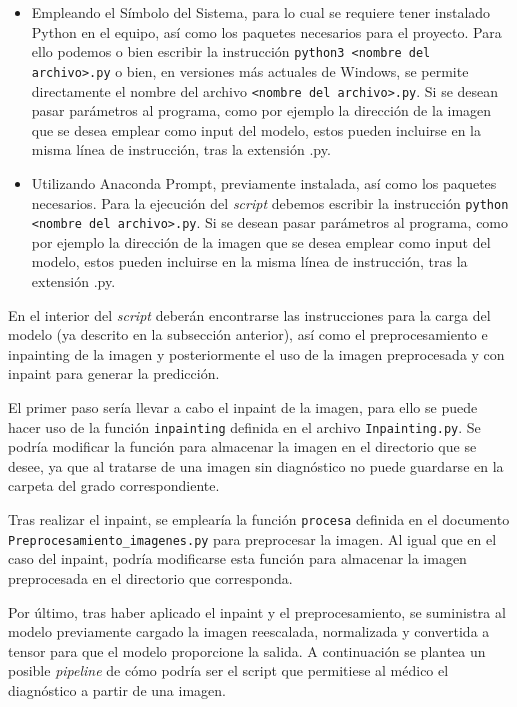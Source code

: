 \begin{itemize}
    \item Empleando el Símbolo del Sistema, para lo cual se requiere tener instalado Python en el equipo, así como los paquetes necesarios para el proyecto. Para ello podemos o bien escribir la instrucción \texttt{python3 <nombre del archivo>.py} o bien, en versiones más actuales de Windows, se permite directamente el nombre del archivo \texttt{<nombre del archivo>.py}. Si se desean pasar parámetros al programa, como por ejemplo la dirección de la imagen que se desea emplear como input del modelo, estos pueden incluirse en la misma línea de instrucción, tras la extensión .py.
    \item Utilizando Anaconda Prompt, previamente instalada, así como los paquetes necesarios. Para la ejecución del \textit{script} debemos escribir la instrucción \texttt{python <nombre del archivo>.py}. Si se desean pasar parámetros al programa, como por ejemplo la dirección de la imagen que se desea emplear como input del modelo, estos pueden incluirse en la misma línea de instrucción, tras la extensión .py.
\end{itemize}

En el interior del \textit{script} deberán encontrarse las instrucciones para la carga del modelo (ya descrito en la subsección anterior), así como el preprocesamiento e inpainting de la imagen y posteriormente el uso de la imagen preprocesada y con inpaint para generar la predicción.

El primer paso sería llevar a cabo el inpaint de la imagen, para ello se puede hacer uso de la función \texttt{inpainting} definida en el archivo \texttt{Inpainting.py}. Se podría modificar la función para almacenar la imagen en el directorio que se desee, ya que al tratarse de una imagen sin diagnóstico no puede guardarse en la carpeta del grado correspondiente.

Tras realizar el inpaint, se emplearía la función \texttt{procesa} definida en el documento \texttt{Preprocesamiento\_imagenes.py} para preprocesar la imagen. Al igual que en el caso del inpaint, podría modificarse esta función para almacenar la imagen preprocesada en el directorio que corresponda. 

Por último, tras haber aplicado el inpaint y el preprocesamiento, se suministra al modelo previamente cargado la imagen reescalada, normalizada y convertida a tensor para que el modelo proporcione la salida. A continuación se plantea un posible \textit{pipeline} de cómo podría ser el script que permitiese al médico el diagnóstico a partir de una imagen.

